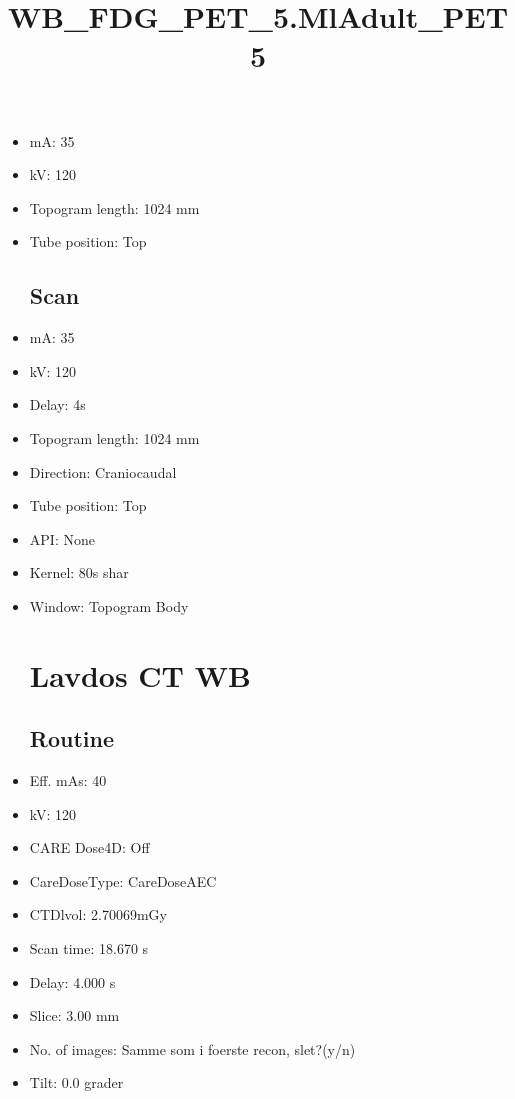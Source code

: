 \documentclass[12pt]{article}
\title{WB\_FDG\_PET\_5.MlAdult\_PET5}
\begin{document}
\maketitle
\newpage
\tableofcontents
\newpage
{}


\begin{itemize}[noitemsep]\section{Topogram}
\subsection{Routine}
\item mA: 35\item kV: 120\item Topogram length: 1024 mm\item Tube position: Top
\subsection{Scan}\item mA: 35\item kV: 120\item Delay: 4s\item Topogram length: 1024 mm\item Direction: Craniocaudal\item Tube position: Top\item API: None\item Kernel: 80s shar\item Window: Topogram Body
\section{Lavdos CT WB}
\subsection{Routine}
\item Eff. mAs: 40\item kV: 120\item CARE Dose4D: Off\item CareDoseType: CareDoseAEC\item CTDlvol: 2.70069mGy\item Scan time: 18.670 s\item Delay: 4.000 s\item Slice: 3.00 mm\item No. of images: Samme som i foerste recon, slet?(y/n)\item Tilt: 0.0 grader

\end{itemize}
\end{document}
